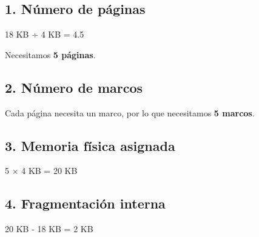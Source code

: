 \documentclass[
  spanish,
  letterpaper,
]{scrbook}
\newenvironment{Shaded}{\begin{snugshade}}{\end{snugshade}}
\newcommand{\NormalTok}[1]{\textcolor[rgb]{0.00,0.23,0.31}{#1}}
\begin{document}
\begin{tcolorbox}[enhanced jigsaw, arc=.35mm, bottomrule=.15mm, bottomtitle=1mm, breakable, colback=white, colbacktitle=quarto-callout-tip-color!10!white, colframe=quarto-callout-tip-color-frame, coltitle=black, left=2mm, leftrule=.75mm, opacityback=0, opacitybacktitle=0.6, rightrule=.15mm, title=\textcolor{quarto-callout-tip-color}{\faLightbulb}\hspace{0.5em}{✅ Solución propuesta}, titlerule=0mm, toprule=.15mm, toptitle=1mm]

\subsection{1. Número de páginas}\label{nuxfamero-de-puxe1ginas}

\begin{Shaded}
\begin{Highlighting}[]
\NormalTok{18 KB ÷ 4 KB = 4.5}
\end{Highlighting}
\end{Shaded}

Necesitamos \textbf{5 páginas}.

\subsection{2. Número de marcos}\label{nuxfamero-de-marcos}

Cada página necesita un marco, por lo que necesitamos \textbf{5 marcos}.

\subsection{3. Memoria física
asignada}\label{memoria-fuxedsica-asignada}

\begin{Shaded}
\begin{Highlighting}[]
\NormalTok{5 × 4 KB = 20 KB}
\end{Highlighting}
\end{Shaded}

\subsection{4. Fragmentación interna}\label{fragmentaciuxf3n-interna-1}

\begin{Shaded}
\begin{Highlighting}[]
\NormalTok{20 KB {-} 18 KB = 2 KB}
\end{Highlighting}
\end{Shaded}


\end{tcolorbox}
\end{document}

